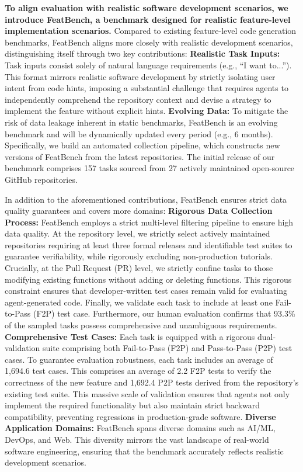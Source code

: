 \textbf{To align evaluation with realistic software development scenarios, we introduce FeatBench, a benchmark designed for realistic feature-level implementation scenarios.} Compared to existing feature-level code generation benchmarks, FeatBench aligns more closely with realistic development scenarios, distinguishing itself through two key contributions:
 \textbf{Realistic Task Inputs:} Task inputs consist solely of natural language requirements (e.g., ``I want to...''). This format mirrors realistic software development by strictly isolating user intent from code hints, imposing a substantial challenge that requires agents to independently comprehend the repository context and devise a strategy to implement the feature without explicit hints.
 \textbf{Evolving Data:} To mitigate the risk of data leakage inherent in static benchmarks, FeatBench is an evolving benchmark and will be dynamically updated every period (e.g., 6 months). Specifically, we build an automated collection pipeline, which constructs new versions of FeatBench from the latest repositories. The initial release of our benchmark comprises 157 tasks sourced from 27 actively maintained open-source GitHub repositories.

In addition to the aforementioned contributions, FeatBench ensures strict data quality guarantees and covers more domains:
 \textbf{Rigorous Data Collection Process:} FeatBench employs a strict multi-level filtering pipeline to ensure high data quality. At the repository level, we strictly select actively maintained repositories requiring at least three formal releases and identifiable test suites to guarantee verifiability, while rigorously excluding non-production tutorials. Crucially, at the Pull Request (PR) level, we strictly confine tasks to those modifying existing functions without adding or deleting functions. This rigorous constraint ensures that developer-written test cases remain valid for evaluating agent-generated code. Finally, we validate each task to include at least one Fail-to-Pass (F2P) test case. Furthermore, our human evaluation confirms that 93.3\% of the sampled tasks possess comprehensive and unambiguous requirements.
 \textbf{Comprehensive Test Cases:} Each task is equipped with a rigorous dual-validation suite comprising both Fail-to-Pass (F2P) and Pass-to-Pass (P2P) test cases. To guarantee evaluation robustness, each task includes an average of 1,694.6 test cases. This comprises an average of 2.2 F2P tests to verify the correctness of the new feature and 1,692.4 P2P tests derived from the repository's existing test suite. This massive scale of validation ensures that agents not only implement the required functionality but also maintain strict backward compatibility, preventing regressions in production-grade software.
 \textbf{Diverse Application Domains:} FeatBench spans diverse domains such as AI/ML, DevOps, and Web. This diversity mirrors the vast landscape of real-world software engineering, ensuring that the benchmark accurately reflects realistic  development scenarios.

